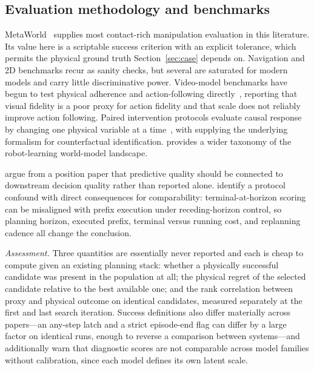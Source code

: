 \documentclass[11pt,letterpaper]{article}
\begin{document}
\subsection{Evaluation methodology and benchmarks}\label{sec:lit-eval}

MetaWorld~\citep{yu2020metaworld} supplies most contact-rich manipulation
evaluation in this literature. Its value here is a scriptable success criterion
with an explicit tolerance, which permits the physical ground truth
Section~\ref{sec:case} depends on. Navigation and 2D benchmarks recur as sanity
checks, but several are saturated for modern models and carry little
discriminative power. Video-model benchmarks have begun to test physical
adherence and action-following directly~\citep{mirabench2026}, reporting that
visual fidelity is a poor proxy for action fidelity and that scale does not
reliably improve action following. Paired intervention protocols evaluate causal
response by changing one physical variable at a time~\citep{whatifworld2026},
with \citet{xia2023neuralcausal} supplying the underlying formalism for
counterfactual identification. \citet{wmsurvey2026} provides a wider taxonomy of
the robot-learning world-model landscape.

\citet{yu2026wmeval} argue from a position paper that predictive quality should
be connected to downstream decision quality rather than reported alone.
\citet{hiddenfailure2026} identify a protocol confound with direct consequences
for comparability: terminal-at-horizon scoring can be misaligned with prefix
execution under receding-horizon control, so planning horizon, executed prefix,
terminal versus running cost, and replanning cadence all change the conclusion.

\emph{Assessment.} Three quantities are essentially never reported and each is
cheap to compute given an existing planning stack: whether a physically
successful candidate was present in the population at all; the physical regret of
the selected candidate relative to the best available one; and the rank
correlation between proxy and physical outcome on identical candidates, measured
separately at the first and last search iteration. Success definitions also
differ materially across papers---an any-step latch and a strict episode-end flag
can differ by a large factor on identical runs, enough to reverse a comparison
between systems---and \citet{chen2026atm} additionally warn that diagnostic
scores are not comparable across model families without calibration, since each
model defines its own latent scale.
\end{document}
